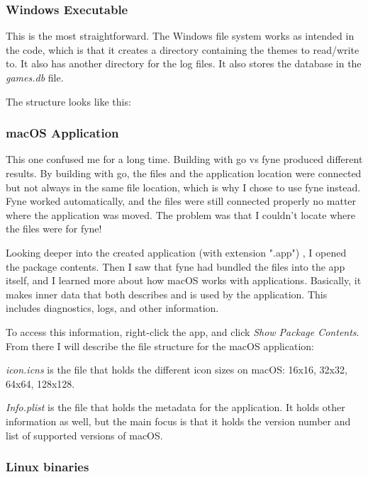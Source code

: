 \subsubsection{Windows Executable}
\label{subsubsec:WinExec}

This is the most straightforward. The Windows file system works as
intended in the code, which is that it creates a directory containing
the themes to read/write to. It also has another directory for the
log files. It also stores the database in the \textit{games.db} file.

The structure looks like this:


\subsubsection{macOS Application}

This one confused me for a long time.
Building with go vs fyne produced different results.
By building with go, the files and the application location were
connected but not always in the same file location, which is why I
chose to use fyne instead.
Fyne worked automatically, and the files were still connected properly
no matter where the application was moved.
The problem was that I couldn't locate where the files were for fyne!

Looking deeper into the created application (with extension ".app") ,
I opened the package contents.
Then I saw that fyne had bundled the files into the app itself, and I
learned more about how macOS works with applications. Basically, it
makes inner data that both describes and is used by the application.
This includes diagnostics, logs, and other information.

To access this information, right-click the app, and click
\textit{Show Package Contents}.
From there I will describe the file structure for the macOS application:


\textit{icon.icns} is the file that holds the different icon sizes on
macOS: 16x16, 32x32, 64x64, 128x128.

\textit{Info.plist} is the file that holds the metadata for the
application. It holds other information as well, but the main focus
is that it holds the version number and list of supported versions of macOS.

\subsubsection{Linux binaries}


